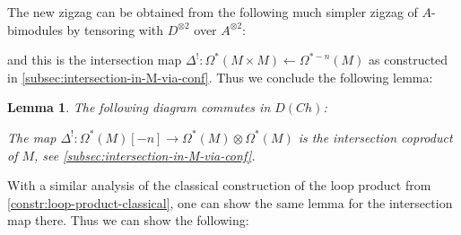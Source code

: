 \documentclass{scrartcl}
\theoremstyle{plain}
\newtheorem{lemma}[theorem]{Lemma}
\theoremstyle{definition}
\DeclareMathOperator{\cone}{cone}
\newcommand{\quiso}{\simeq}
\newcommand{\from}{\leftarrow}
\DeclareMathOperator{\id}{id}
\DeclareMathOperator{\cConf}{\overline{Conf}}
\begin{document}
The new zigzag can be obtained from the following much simpler zigzag of $A$-bimodules by tensoring with $D^{\otimes 2}$ over $A^{\otimes 2}$:
\begin{center}
\end{center}

and this is the intersection map $\Delta^!\colon\Omega^*(M\times M)\from \Omega^{*-n}(M)$ as constructed in \ref{subsec:intersection-in-M-via-conf}. Thus we conclude the following lemma:

\begin{lemma}
    The following diagram commutes in $D(Ch)$:
    \begin{center}
    \end{center}
    The map $\Delta^!\colon \Omega^*(M)[-n]\to\Omega^*(M)\otimes \Omega^*(M)$ is the intersection coproduct of $M$, see \cref{subsec:intersection-in-M-via-conf}.
\end{lemma}
With a similar analysis of the classical construction of the loop product from \ref{constr:loop-product-classical}, one can show the same lemma for the intersection map there. Thus we can show the following:
\end{document}

